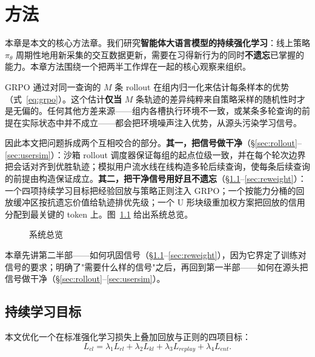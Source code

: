 \chapter{方法}
\label{chap:method}

本章是本文的核心方法章。我们研究\textbf{智能体大语言模型的持续强化学习}：线上策略 $\pi_\theta$ 周期性地用新采集的交互数据更新，需要在习得新行为的同时\textbf{不遗忘}已掌握的能力。本章方法围绕一个把两半工作焊在一起的核心观察来组织。

GRPO 通过对同一查询的 $M$ 条 rollout 在组内归一化来估计每条样本的优势（式~\eqref{eq:grpo}）。这个估计\textbf{仅当} $M$ 条轨迹的差异纯粹来自策略采样的随机性时才是无偏的。任何其他方差来源——组内各槽执行环境不一致，或某条多轮查询的前提在实际状态中并不成立——都会把环境噪声注入优势，从源头污染学习信号。

因此本文把问题拆成两个互相咬合的部分。\textbf{其一，把信号做干净}（\S\ref{sec:rollout}--\ref{sec:usersim}）：沙箱 rollout 调度器保证每组的起点位级一致，并在每个轮次边界把会话对齐到优胜轨迹；模拟用户流水线在线构造多轮后续查询，使每条后续查询的前提由构造保证成立。\textbf{其二，把干净信号用好且不遗忘}（\S\ref{sec:obj}--\ref{sec:reweight}）：一个四项持续学习目标把经验回放与策略正则注入 GRPO；一个按能力分桶的回放缓冲区按抗遗忘价值给轨迹排优先级；一个 U 形块级重加权方案把回放的信用分配到最关键的 token 上。图~\ref{fig:overview} 给出系统总览。

\begin{figure}[htbp]
\centering
{}
\caption{系统总览}
\label{fig:overview}
\end{figure}

本章先讲第二半部——如何巩固信号（\S\ref{sec:obj}--\ref{sec:reweight}），因为它界定了训练对信号的要求；明确了"需要什么样的信号"之后，再回到第一半部——如何在源头把信号做干净（\S\ref{sec:rollout}--\ref{sec:usersim}）。

\section{持续学习目标}
\label{sec:obj}

本文优化一个在标准强化学习损失上叠加回放与正则的四项目标：
\begin{equation}
\label{eq:lcl}
L_{cl} = \lambda_1 L_{rl} + \lambda_2 L_{kl} + \lambda_3 L_{replay} + \lambda_4 L_{ent}.
\end{equation}

